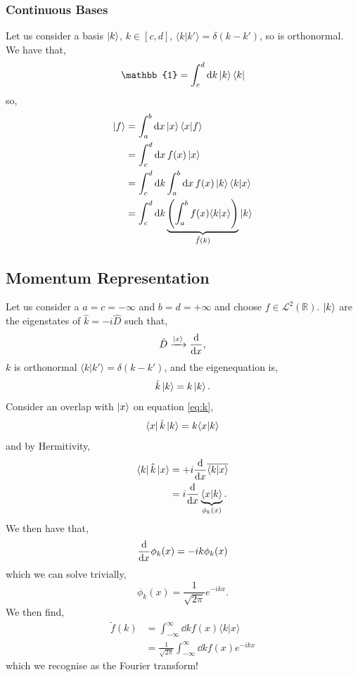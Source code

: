 \documentclass{book}
\renewcommand{\braket}[2]{\langle#1|#2\rangle}
\begin{document}
\subsubsection{Continuous Bases}
Let us consider a basis $\ket{k}$, $k \in \left[c,d\right]$, $\braket{k}{k'} = \delta(k - k')$, so is orthonormal. We have that,
\begin{equation}
	\mathbb{1} = \int_c^d \dd{k}\ket{k}\bra{k}
\end{equation}
so,
\begin{equation}
	\begin{split}
		\ket{f} &= \int_a^b\dd{x}\ket{x}\bra{x}\ket{f} \\
		& = \int_c^d \dd{x}f(x)\ket{x} \\
		& = \int_c^d\dd{k} \int_a^b \dd{x}f(x)\ket{k}\braket{k}{x} \\
		& = \int_c^d \dd{k} \underbrace{\left(\int_a^bf(x)\braket{k}{x}\right)}_{\tilde{f}(k)}\ket{k}
	\end{split}
\end{equation}
\subsection{Momentum Representation}
Let us consider a $a = c = -\infty$ and $b = d = +\infty$ and choose $f \in \mathcal{L}^2(\mathbb{R})$. $\ket{k}$ are the eigenstates of $\hat{k} = -i\hat{D}$ such that,
\begin{equation}
	\hat{D} \xrightarrow{\ket{x}}\dv{x},
\end{equation}
$k$ is orthonormal $\braket{k}{k'} = \delta(k - k')$, and the eigenequation is,
\begin{equation}
	\hat{k}\ket{k} = k\ket{k}. \label{eq:k}
\end{equation}
Consider an overlap with $\ket{x}$ on equation \eqref{eq:k},
\begin{equation}
	\bra{x}\hat{k}\ket{k} = k \braket{x}{k}
\end{equation}
and by Hermitivity,
\begin{equation}
	\begin{split}
	\bra{k}\hat{k}\ket{x} &= +i\dv{x}\overline{\braket{k}{x}}\\
	& = i\dv{x}\underbrace{\braket{x}{k}}_{\phi_k(x)}.
	\end{split}
\end{equation}
We then have that,
\begin{equation}
	\dv{x}\phi_k(x) = -ik\phi_k(x)
\end{equation}
which we can solve trivially,
\begin{equation}
	\phi_k(x) = \frac{1}{\sqrt{2\pi}} e^{-ikx}.
\end{equation}
We then find,
\begin{equation}
	\begin{split}
		\tilde{f}(k) & = \int_{-\infty}^{\infty}\dd{k}f(x) \braket{k}{x} \\
		& = \frac{1}{\sqrt{2\pi}}\int_{-\infty}^{\infty}\dd{k}f(x)e^{-ikx}
	\end{split}
\end{equation}
which we recognise as the Fourier transform!
\end{document}
